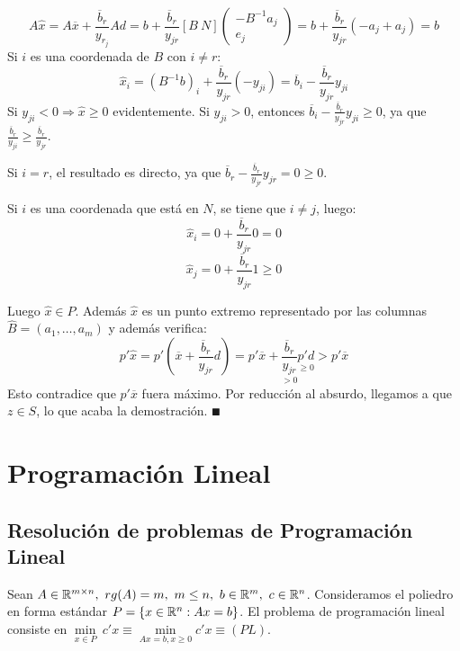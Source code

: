 \documentclass[PM.tex]{subfiles}
\begin{document}
\begin{dem}
\begin{itemize}
	\[ A\hat{x} = A\overline{x} + \frac{\overline{b}_r}{y_{r_j}} A d = b + \frac{\overline{b}_r}{y_{jr}} [B\ N] \begin{pmatrix}-B^{-1}a_j\\e_j\end{pmatrix} = b + \frac{\overline{b}_r}{y_{jr}}(-a_j + a_j) = b \]
	Si $i$ es una coordenada de $B$ con $i \neq r$:
	\[ \hat{x}_i = (B^{-1}b)_i + \frac{\overline{b}_r}{y_{jr}}(-y_{ji}) = \overline{b}_i - \frac{\overline{b}_r}{y_{jr}}y_{ji} \]
	Si $y_{ji} < 0 \Rightarrow \hat{x} ≥ 0$ evidentemente. Si $y_{ji} > 0$, entonces $\overline{b}_i - \frac{\overline{b}_r}{y_{jr}}y_{ji} ≥ 0$, ya que $ \frac{\overline{b}_r}{y_{ji}} ≥ \frac{\overline{b}_r}{y_{jr}}$.
	
	Si $i = r$, el resultado es directo, ya que $\overline{b}_r - \frac{\overline{b}_r}{y_{jr}}y_{jr} = 0 ≥ 0$.
	
	Si $i$ es una coordenada que está en $N$, se tiene que $i \neq j$, luego:
	\[ \hat{x}_i = 0 +  \frac{\overline{b}_r}{y_{jr}}0 = 0 \]
	\[ \hat{x}_j = 0 +  \frac{\overline{b}_r}{y_{jr}}1 ≥ 0 \]
	
	Luego $\hat{x} \in P$. Además $\hat{x}$ es un punto extremo representado por las columnas $\hat{B}= (a_1,\dots,a_m)$ y además verifica:
	\[ p'\hat{x} = p'(\overline{x} + \frac{\overline{b}_r}{y_{jr}}d) = p'\overline{x} + \underset{>0}{\frac{\overline{b}_r}{y_{jr}}} \underset{≥0}{p'd} > p'\overline{x} \]
	Esto contradice que $p'\overline{x}$ fuera máximo. Por reducción al absurdo, llegamos a que $z \in S$, lo que acaba la demostración.
	$\QED$
\end{itemize}
\end{dem}

\chapter{Programación Lineal} %

\section{Resolución de problemas de Programación Lineal}

Sean $A\in\mathbb{R}^{m\times n},\ rg(A)=m,\ m\leq n,\ b\in\mathbb{R}^m,\ c\in\mathbb{R}^n$. Consideramos el poliedro en forma estándar $P=\{x\in\mathbb{R}^n: Ax=b\}$. El problema de programación lineal consiste en $\underset{x\in P}{\min}\ c'x \equiv \underset{Ax=b,x\geq 0}{\min} c'x\equiv (PL)$. 
\end{document}
